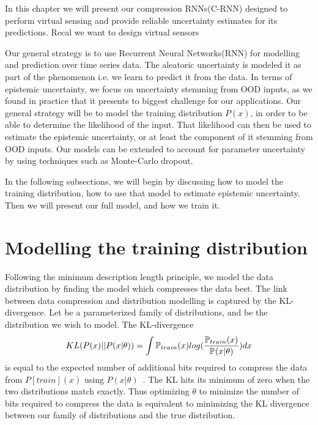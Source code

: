 \documentclass[../main.tex]{subfiles}
\begin{document}
In this chapter we will present our compression RNNs(C-RNN) designed to perform virtual sensing and provide reliable uncertainty estimates for its predictions. Recal we want to design virtual sensors  

Our general strategy is to use Recurrent Neural Networks(RNN) for modelling and prediction over time series data. 
The aleatoric uncertainty is modeled it as part of the phenomenon i.e. we learn to predict it from the data.
In terms of epistemic uncertainty, we focus on uncertainty stemming from OOD inputs, as we found in practice that it presents to biggest challenge for our applications. Our general strategy will be to model the training distribution $P(x)$, in order to be able to determine the likelihood of the input. That likelihood can then be used to estimate the epistemic uncertainty, or at least the component of it stemming from OOD inputs. Our models can be extended to account for parameter uncertainty by using techniques such as Monte-Carlo dropout\citep{gal2016dropout}. 

In the following subsections, we will begin by discussing how to model the training distribution, how to use that model to estimate epistemic uncertainty. Then we will present our full model, and how we train it.

\section{Modelling the training distribution}
\label{sec:information}

Following the minimum description length principle\citep{rissanen1978modeling}, we model the data distribution by finding the model which compresses the data best. The link between data compression and distribution modelling is captured by the KL-divergence. Let  be a parameterized family of distributions, and  be the distribution we wish to model. The KL-divergence
\begin{equation}
    \label{eq:kl}
    KL(P(x) || P(x|\theta)) = \int {\pdf[train]{x} log(\frac{\pdf[train]{x}}{\pdf{x|\theta}})} dx
\end{equation}{}
is equal to the expected number of additional bits required to compress the data from $P[train](x)$ using $P(x|\theta)$~\citep[chapter~5]{mackay2003information}. The KL hits its minimum of zero when the two distributions match exactly. Thus optimizing $\theta$ to minimize the number of bits required to compress the data is equivalent to minimizing the KL divergence between our family of distributions and the true distribution. 
\end{document}
